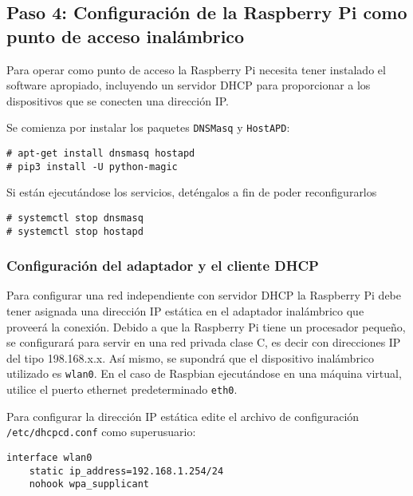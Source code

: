 %
%


\subsection{Paso 4: Configuración de la Raspberry Pi como punto de acceso inalámbrico}%
\label{sec:ap}

Para operar como punto de acceso la Raspberry Pi necesita tener instalado el software apropiado, incluyendo un servidor DHCP para proporcionar a los dispositivos que se conecten una dirección IP. %

Se comienza por instalar los paquetes \texttt{DNSMasq} y \texttt{HostAPD}:

\begin{Verbatim}
# apt-get install dnsmasq hostapd
# pip3 install -U python-magic
\end{Verbatim}

Si están ejecutándose los servicios, deténgalos a fin de poder reconfigurarlos
\begin{Verbatim}
# systemctl stop dnsmasq
# systemctl stop hostapd
\end{Verbatim}


\subsubsection{Configuración del adaptador y el cliente DHCP}%
\label{sec:ap-adapter}
Para configurar una red independiente con servidor DHCP la Raspberry Pi debe tener asignada una dirección IP estática en el adaptador inalámbrico que proveerá la conexión.
Debido a que la Raspberry Pi tiene un procesador pequeño, se configurará para servir en una red privada clase C, es decir con direcciones IP del tipo 198.168.x.x.
Así mismo, se supondrá que el dispositivo inalámbrico utilizado es \texttt{wlan0}.
En el caso de Raspbian ejecutándose en una máquina virtual, utilice el puerto ethernet predeterminado \texttt{eth0}.

Para configurar la dirección IP estática edite el archivo de configuración \texttt{/etc/dhcpcd.conf} como superusuario:

\begin{Verbatim}
interface wlan0
    static ip_address=192.168.1.254/24
    nohook wpa_supplicant
\end{Verbatim}

